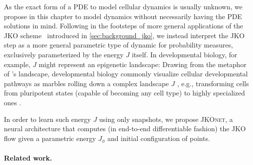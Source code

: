  As the exact form of a PDE to model cellular dynamics is usually unknown, we propose in this chapter to model dynamics without necessarily having the PDE solutions in mind.
Following in the footsteps of more general applications of the \acrlong{JKO} scheme~\citep[\S4.8]{santambrogio2017euclidean} introduced in \cref{sec:background_jko}, we instead interpret  the \acrshort{JKO} step as a more general parametric type of dynamic for probability measures, exclusively parameterized by the energy $J$ itself.
In developmental biology, for example, $J$ might represent an epigenetic landscape: Drawing from the metaphor of \citeauthor{waddington1957strategy}'s landscape, developmental biology commonly visualize cellular developmental pathways as marbles rolling down a complex landscape $J$ \citep{waddington1957strategy}, e.g., transforming cells from pluripotent states (capable of becoming any cell type) to highly specialized ones \citep{schiebinger2021reconstructing}. 

In order to learn such energy $J$ using only snapshots, we propose \textsc{JKOnet}, a neural architecture that computes (in end-to-end differentiable fashion) the JKO flow given a parametric energy $J_\phi$ and initial configuration of points.


\paragraph{Related work.}


